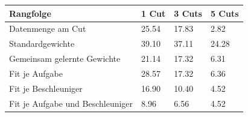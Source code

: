 \begin{tabular}{@{}llll@{}}
\toprule
Rangfolge & 1 Cut & 3 Cuts & 5 Cuts \\
\midrule
Datenmenge am Cut & 25.54 & 17.83 & 2.82 \\
Standardgewichte & 39.10 & 37.11 & 24.28 \\
Gemeinsam gelernte Gewichte & 21.14 & 17.32 & 6.31 \\
Fit je Aufgabe & 28.57 & 17.32 & 6.36 \\
Fit je Beschleuniger & 16.90 & 10.40 & 4.52 \\
Fit je Aufgabe und Beschleuniger & 8.96 & 6.56 & 4.52 \\
\bottomrule
\end{tabular}
